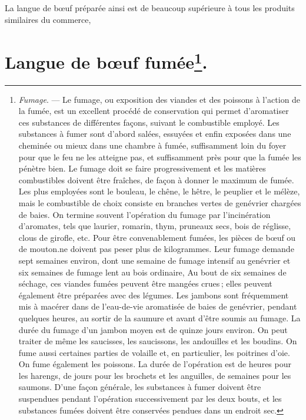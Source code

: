 La langue de bœuf préparée ainsi est de beaucoup supérieure à tous les produits
similaires du commerce,

\section*{\centering Langue de bœuf fumée\footnote{\textit{
Fumage}. — Le
fumage, ou exposition des viandes et des poissons à l'action de la fumée, est
un excellent procédé de conservation qui permet d'aromatiser ces substances de
différentes façons, suivant le combustible employé. Les substances à fumer sont
d'abord salées, essuyées et enfin exposées dans une cheminée ou mieux dans une
chambre à fumée, suffisamment loin du foyer pour que le feu ne les atteigne
pas, et suffisamment près pour que la fumée les pénètre bien. Le fumage doit se
faire progressivement et les matières combustibles doivent être fraîches, de
façon à donner le maximum de fumée. Les plus employées sont le bouleau, le
chêne, le hêtre, le peuplier et le mélèze, mais le combustible de choix
consiste en branches vertes de genévrier chargées de baies.
\protect\endgraf
On termine souvent l'opération du fumage par l'incinération d'aromates, tels
que laurier, romarin, thym, pruneaux secs, bois de réglisse, clous de girofle,
etc.
\protect\endgraf
Pour être convenablement fumées, les pièces de bœuf ou de mouton.ne doivent pas
peser plus de {\mmm} kilogrammes. Leur fumage demande sept semaines environ, dont
une semaine de fumage intensif au genévrier et six semaines de fumage lent au
bois ordinaire, Au bout de six semaines de séchage, ces viandes fumées peuvent
être mangées crues ; elles peuvent également être préparées avec des légumes.
\protect\endgraf
Les jambons sont fréquemment mis à macérer dans de l'eau-de-vie aromatisée de
baies de genévrier, pendant quelques heures, au sortir de la saumure et avant
d'être soumis au fumage. La durée du fumage d'un jambon moyen est de quinze
jours environ.
\protect\endgraf
{}
On peut traiter de même les saucisses, les saucissons, les andouilles et les
boudins.
\protect\endgraf
{}
On fume aussi certaines parties de volaille et, en particulier, les poitrines
d'oie.
\protect\endgraf
{}
On fume également les poissons. La durée de l'opération est de {\mmm} heures pour
les harengs, de {\mmm} jours pour les brochets et les anguilles, de {\mmm} semaines pour
les saumons.
\protect\endgraf
D'une façon générale, les substances à fumer doivent être suspendues pendant
l'opération successivement par les deux bouts, et les substances fumées doivent
être conservées pendues dans un endroit sec.}.}

